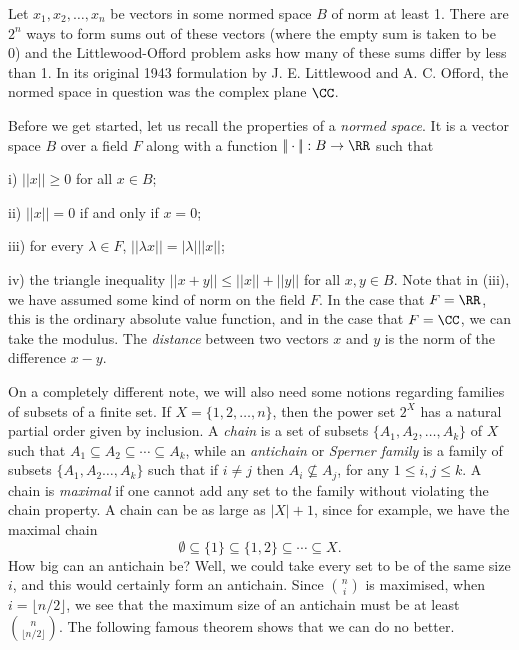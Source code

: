 


\classicmode

\def\norm#1{|\!|#1|\!|}
\def\C{{\cal C}}
\def\F{{\cal F}}
\def\eps{\epsilon}


\medskip
Let $x_1,x_2,\ldots,x_n$ be vectors in some normed space $B$ of norm at least 1.
There are $2^n$ ways to form sums out of these
vectors (where the empty sum is taken to be 0) and the Littlewood-Offord problem asks how many of these sums
differ by less than 1. In its original 1943 formulation by J. E. Littlewood and A. C. Offord,
the normed space in question was the complex plane $\CC$.

Before we get started, let us recall the properties of a {\it normed space}. It is a vector space $B$ over
a field $F$ along with
a function $\norm{\cdot} : B \to \RR$ such that
\medskip
\item{i)} $\norm x\geq 0$ for all $x\in B$;
\smallskip
\item{ii)} $\norm x = 0$ if and only if $x = 0$;
\smallskip
\item{iii)} for every $\lambda \in F$, $\norm{\lambda x} = |\lambda|\norm x$;
\smallskip
\item{iv)} the triangle inequality $\norm{x+y} \leq \norm x + \norm y$ for all $x,y\in B$.
\medskip
Note that in (iii), we have assumed some kind of norm on the field $F$. In the case that $F = \RR$, this
is the ordinary absolute value function, and in the case that $F=\CC$, we can take the modulus.
The {\it distance} between two vectors $x$ and $y$ is the norm of the difference $x-y$.

On a completely different note, we will also need some notions regarding families of subsets of a finite set.
If $X = \{1,2,\ldots,n\}$,
then the power set $2^X$ has a natural partial order given by inclusion. A {\it chain} is a set of subsets
$\{A_1,A_2, \ldots, A_k\}$ of $X$ such that $A_1\subseteq A_2\subseteq\cdots\subseteq A_k$, while an
{\it antichain} or {\it Sperner family} is a family of subsets $\{A_1,A_2\ldots,A_k\}$ such that if $i\neq j$
then $A_i\not\subseteq A_j$, for any $1\leq i,j \leq k$. A chain is {\it maximal} if one cannot add any set
to the family without violating the chain property. A chain can be as large as $|X|+1$, since for example,
we have the maximal chain
$$\emptyset\subseteq \{1\}\subseteq \{1,2\} \subseteq \cdots \subseteq X.$$
How big can an antichain be? Well, we could take every set to be of the same size $i$, and this would certainly
form an antichain. Since ${n\choose i}$ is maximised, when $i =\lfloor n/2\rfloor$, we see that the maximum
size of an antichain must be at least ${n\choose \lfloor n/2\rfloor}$. The following famous theorem shows that
we can do no better.

